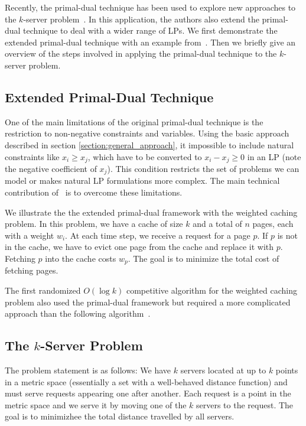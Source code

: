 Recently, the primal-dual technique has been used to explore new approaches to the $k$-server problem~\cite{bansal10:k-server}.
In this application, the authors also extend the primal-dual technique to deal with a wider range of LPs.
We first demonstrate the extended primal-dual technique with an example from~\cite{bansal10:k-server}.
Then we briefly give an overview of the steps involved in applying the primal-dual technique to the $k$-server problem.

\subsection{Extended Primal-Dual Technique}
One of the main limitations of the original primal-dual technique is the restriction to non-negative constraints and variables.
Using the basic approach described in section \ref{section:general_approach}, it impossible to include natural constraints like $x_i \geq x_j$, which have to be converted to $x_i - x_j \geq 0$ in an LP (note the negative coefficient of $x_j$).
This condition restricts the set of problems we can model or makes natural LP formulations more complex.
The main technical contribution of~\cite{bansal10:k-server} is to overcome these limitations.

We illustrate the the extended primal-dual framework with the weighted caching problem.
In this problem, we have a cache of size $k$ and a total of $n$ pages, each with a weight $w_i$.
At each time step, we receive a request for a page $p$.
If $p$ is not in the cache, we have to evict one page from the cache and replace it with $p$.
Fetching $p$ into the cache costs $w_p$.
The goal is to minimize the total cost of fetching pages.

The first randomized $O(\log k)$ competitive algorithm for the weighted caching problem also used the primal-dual framework but required a more complicated approach than the following algorithm~\cite{bansal07:weighted-paging}.

\subsection{The $k$-Server Problem}
The problem statement is as follows:
We have $k$ servers located at up to $k$ points in a metric space (essentially a set with a well-behaved distance function) and must serve requests appearing one after another.
Each request is a point in the metric space and we serve it by moving one of the $k$ servers to the request.
The goal is to minimizhee the total distance travelled by all servers.

